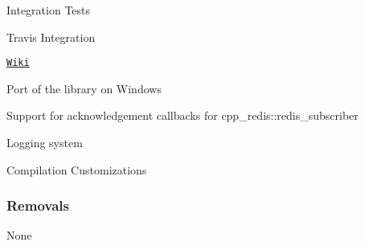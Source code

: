 \begin{DoxyItemize}
\item Integration Tests
\item Travis Integration
\item \href{https://github.com/Cylix/cpp_redis/wiki}{\tt Wiki}
\item Port of the library on Windows
\item Support for acknowledgement callbacks for {\ttfamily cpp\+\_\+redis\+::redis\+\_\+subscriber}
\item Logging system
\item Compilation Customizations \subsubsection*{Removals}
\end{DoxyItemize}

None 